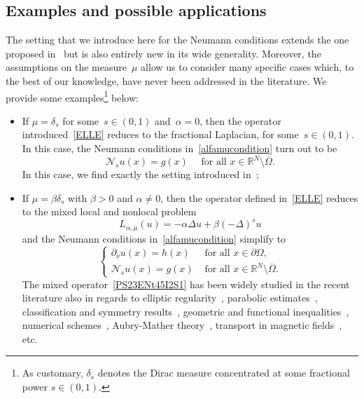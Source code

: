 \documentclass[12pt,a4paper,intlimits,sumlimits]{amsart}
\def \R {\mathbb{R}}
\def \Ns {\mathscr{N}_{s}}
\theoremstyle{definition}
\theoremstyle{plain}
\numberwithin{equation}{section}
\begin{document}
\subsection{Examples and possible applications}
The setting that we introduce here for the Neumann conditions
extends the one proposed in~\cite{MR3651008} but is also entirely new in its wide generality. Moreover, the assumptions on the measure~$\mu$ allow us to consider many specific cases which, to the best of our knowledge, have never been addressed in the literature.  We provide some examples\footnote{As customary,
$\delta_s $ denotes the Dirac measure concentrated at some fractional power $s\in (0, 1)$.} below:
\begin{itemize}
\item If $\mu=\delta_s$ for some~$s\in(0,1)$ and~$\alpha=0$, then the operator introduced~\eqref{ELLE} reduces to the fractional Laplacian, for some~$s\in (0, 1)$. In this case, the Neumann conditions in~\eqref{alfamucondition} turn out to be
\[
\Ns u(x) = g(x) \quad\mbox{ for all }x\in \R^N \setminus \overline{\Omega}.
\]
In this case, we find exactly the setting introduced in~\cite{MR3651008};
\item If $\mu=\beta\delta_s$ with $\beta>0$ and $\alpha\neq 0$, then the operator defined in~\eqref{ELLE} reduces to the mixed local and nonlocal problem
\begin{equation}\label{PS23ENt45I2S1}
L_{\alpha, \mu} (u) = -\alpha \Delta u + \beta (-\Delta)^s u
\end{equation}
and the Neumann conditions in~\eqref{alfamucondition} simplify to
\begin{equation}\label{PS23ENt45I2S}
\begin{cases}
\partial_\nu u(x)=h(x) &\mbox{ for all } x\in \partial\Omega,\\
\Ns u(x) = g (x)&\mbox{ for all }x\in \R^N \setminus \overline{\Omega}.
\end{cases}
\end{equation}
The mixed operator~\eqref{PS23ENt45I2S1} has been widely studied in the recent literature
also in regards to 
elliptic regularity~\cite{%
MR2129093, MR2928344, MR2912450, MR3724879, MR4387204, MR4381148, MR4693935},
parabolic estimates~\cite{MR2653895, MR2911421}, 
classification and symmetry results~\cite{MR3485125},
geometric and functional inequalities~\cite{MR4391102, MR4645045},
numerical schemes~\cite{MR2679574},
Aubry-Mather theory~\cite{MR2542727},
transport in magnetic fields~\cite{BLZ},
etc.


\end{itemize}
\end{document}
